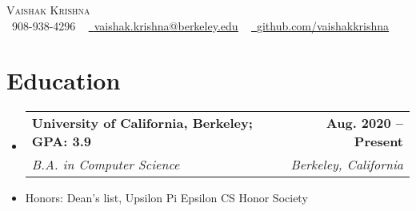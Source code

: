 \documentclass[letterpaper,11pt]{article}
\makeatletter
\newcommand{\resumeSubheading}[4]{
  \vspace{-2pt}\item
    \begin{tabular*}{1.0\textwidth}[t]{l@{\extracolsep{\fill}}r}
      \textbf{#1} & \textbf{\small #2} \\
      \textit{\small#3} & \textit{\small #4} \\
    \end{tabular*}\vspace{-7pt}
}
\newcommand{\resumeSubHeadingListStart}{\begin{itemize}[leftmargin=0.0in, label={}]}
\newcommand{\resumeSubHeadingListEnd}{\end{itemize}}
\makeatother
\begin{document}

\begin{center}
    {\Huge \scshape Vaishak Krishna} \\ \vspace{1pt}
    \small \raisebox{-0.1\height}\faPhone\ 908-938-4296 ~ \href{mailto:vaishak.krishna@berkeley.edu}{\raisebox{-0.2\height}\faEnvelope\  \underline{vaishak.krishna@berkeley.edu}} ~ 
    \href{https://github.com/vaishakkrishna}{\raisebox{-0.2\height}\faGithub\ \underline{github.com/vaishakkrishna}}
    \vspace{-8pt}
\end{center}


\section{Education}
  \resumeSubHeadingListStart
    \resumeSubheading
  {University of California, Berkeley; GPA: 3.9}{Aug. 2020 -- Present}
      {B.A. in Computer Science}{Berkeley, California}
    \vspace{-5pt}
      \item{Honors: Dean's list, Upsilon Pi Epsilon CS Honor Society}

  \resumeSubHeadingListEnd
  
\end{document}
